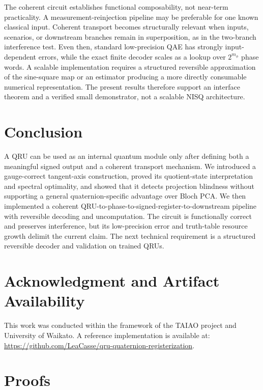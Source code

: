 \documentclass[a4paper,twocolumn,11pt,unpublished]{quantumarticle}
\begin{document}
The coherent circuit establishes functional composability, not near-term practicality. A measurement-reinjection pipeline may be preferable for one known classical input. Coherent transport becomes structurally relevant when inputs, scenarios, or downstream branches remain in superposition, as in the two-branch interference test. Even then, standard low-precision QAE has strongly input-dependent errors, while the exact finite decoder scales as a lookup over $2^{m_\phi}$ phase words. A scalable implementation requires a structured reversible approximation of the sine-square map or an estimator producing a more directly consumable numerical representation. The present results therefore support an interface theorem and a verified small demonstrator, not a scalable NISQ architecture.

\section{Conclusion}

A QRU can be used as an internal quantum module only after defining both a meaningful signed output and a coherent transport mechanism. We introduced a gauge-correct tangent-axis construction, proved its quotient-state interpretation and spectral optimality, and showed that it detects projection blindness without supporting a general quaternion-specific advantage over Bloch PCA. We then implemented a coherent QRU-to-phase-to-signed-register-to-downstream pipeline with reversible decoding and uncomputation. The circuit is functionally correct and preserves interference, but its low-precision error and truth-table resource growth delimit the current claim. The next technical requirement is a structured reversible decoder and validation on trained QRUs.

\section*{Acknowledgment and Artifact Availability}
This work was conducted within the framework of the TAIAO project and University of Waikato. A reference implementation is available at: \url{https://github.com/LeaCasse/qru-quaternion-registerization}.

\appendix

\section{Proofs}\label{app:proofs}
\end{document}
